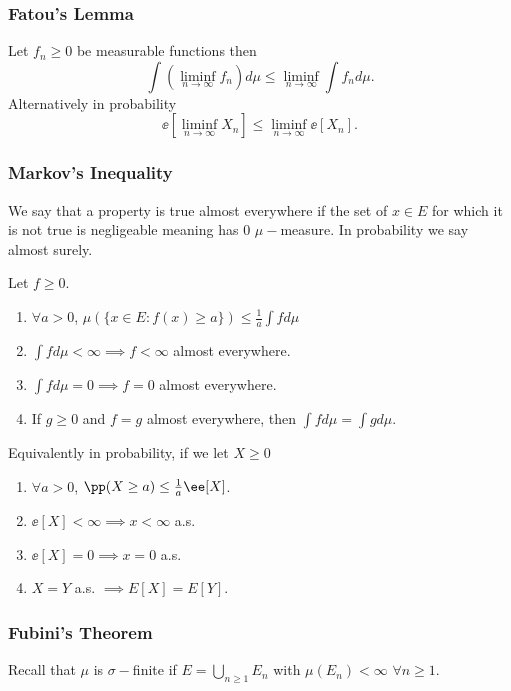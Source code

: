 \documentclass[../main.tex]{subfiles}
\begin{document}
\subsubsection{Fatou's Lemma}

\begin{theorem}
  Let $f_n \geq 0$ be measurable functions then
  \[
    \int (\liminf_{n \to \infty} f_n)d\mu \leq \liminf_{n \to \infty}
    \int f_n d\mu
  .\] 
  Alternatively in probability
  \[
    \ee[\liminf_{n \to \infty} X_n] \leq \liminf_{n \to \infty}
    \ee[X_n] 
  .\] 
\end{theorem}

\subsubsection{Markov's Inequality}
We say that a property is true almost everywhere if the set of $x \in
E$ for which it is not true is negligeable meaning has $0$
$\mu-$measure. In probability we say almost surely.

\begin{proposition}
    Let $f \geq 0$.

    \begin{enumerate}
      \item $\forall a > 0$, $\mu(\{ x \in E \colon f(x) \geq a \})
        \leq \frac{1}{a} \int fd\mu $
      \item $\int f d\mu < \infty \implies f < \infty$ almost
        everywhere.
      \item $\int f d\mu =0 \implies f = 0$ almost everywhere.
      \item If $g \geq 0$ and $f = g$ almost everywhere, then $\int f
        d\mu = \int g d\mu$.
    \end{enumerate}

    Equivalently in probability, if we let $X \geq 0$

    \begin{enumerate}
      \item $\forall a > 0$, $\pp(X \geq a) \leq \frac{1}{a} \ee[X]$.
      \item $\ee[X] < \infty \implies x < \infty$ a.s.
      \item $\ee[X] = 0 \implies x = 0$ a.s.
      \item $X = Y$ a.s. $\implies E[X] = E[Y]$.
    \end{enumerate}
\end{proposition}

\subsubsection{Fubini's Theorem} Recall that $\mu$ is $\sigma-$finite if $E = \bigcup_{n \geq 1} E_n$ with $\mu(E_n) < \infty$ $\forall n \geq 1$. 
\vspace{0.4em}
\end{document}
